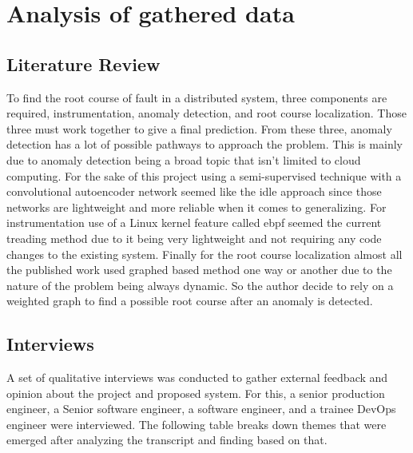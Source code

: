 \section{Analysis of gathered data}

\subsection{Literature Review}

To find the root course of fault in a distributed system, three components are required, instrumentation, anomaly detection, and root course localization. Those three must work together to give a final prediction. From these three, anomaly detection has a lot of possible pathways to approach the problem. This is mainly due to anomaly detection being a broad topic that isn't limited to cloud computing. For the sake of this project using a semi-supervised technique with a convolutional autoencoder network seemed like the idle approach since those networks are lightweight and more reliable when it comes to generalizing. For instrumentation use of a Linux kernel feature called \ac{ebpf} seemed the current treading method due to it being very lightweight and not requiring any code changes to the existing system. Finally for the root course localization almost all the published work used graphed based method one way or another due to the nature of the problem being always dynamic. So the author decide to rely on a weighted graph to find a possible root course after an anomaly is detected.

\subsection{Interviews}

A set of qualitative interviews was conducted to gather external feedback and opinion about the project and proposed system. For this, a senior production engineer, a Senior software engineer, a software engineer, and a trainee DevOps engineer were interviewed. The following table breaks down themes that were emerged after analyzing the transcript and finding based on that.

